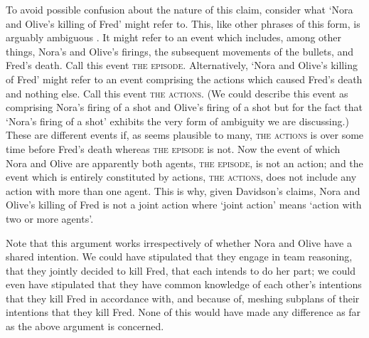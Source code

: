 \documentclass[12pt,a4paper]{extarticle}
\begin{document}
To avoid possible confusion about the nature of this claim, consider  what `Nora and Olive's killing of Fred' might refer to.
This, like other phrases of this form, is arguably ambiguous \citep[p.\ 84]{pietroski_actions_1998}. 
It might refer to an event which includes, among other things, Nora's and Olive's firings, the subsequent movements of the bullets, and Fred's death.
Call this event \textsc{the episode}.
Alternatively, `Nora and Olive's killing of Fred' might refer to an event comprising the actions which caused Fred's death and nothing else.
Call this event \textsc{the actions}.
(We could describe this event as comprising Nora's firing of a shot and Olive's firing of a shot but for the fact that `Nora's firing of a shot' exhibits the very form of ambiguity we are discussing.)
These are different events if, as seems plausible to many, \textsc{the actions} is over some time before Fred's death whereas \textsc{the episode} is not.
Now the event of which Nora and Olive are apparently both agents, \textsc{the episode}, is not an action;
and the event which is entirely constituted by actions, \textsc{the actions}, does not include any action with more than one agent.
This is why, given Davidson's claims, Nora and Olive's killing of Fred is not a joint action where `joint action' means `action with two or more agents'.  

Note that  this argument works irrespectively of whether Nora and Olive have a shared intention.
We could have stipulated that they engage in team reasoning, that they jointly decided to kill Fred, that each intends to do her part; we could even have stipulated that they have common knowledge of each other's intentions that they kill Fred in accordance with, and because of, meshing subplans of their  intentions that they kill Fred.
None of this would have made  any difference as far as the above argument is concerned.
\end{document}
